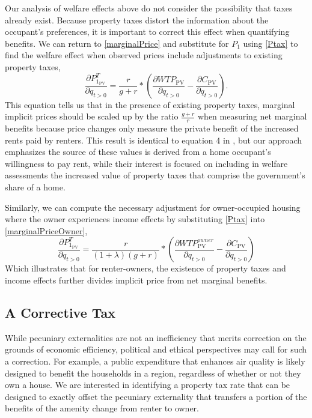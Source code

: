 \documentclass[ecta,nameyear,draft]{econsocart}
\theoremstyle{plain}
\theoremstyle{remark}
\begin{document}
Our analysis of welfare effects above do not consider the possibility that taxes already exist. Because property taxes distort the information about the occupant's preferences, it is important to correct this effect when quantifying benefits. We can return to \ref{marginalPrice} and substitute for $P_1$ using \ref{Ptax} to find the welfare effect when observed prices include adjustments to existing property taxes,
\begin{equation}
\frac{\partial P^T_{1_{\mathrm{PV}}}} {\partial q_{t>0}}=\frac{r}{g+r}*\left(\frac{\partial \mathit{WTP}_{\mathrm{PV}}}{\partial q_{t>0}}-\frac{\partial C_{\mathrm{PV}}}{\partial q_{t>0}}\right). \label{marginalPriceT}
\end{equation}
This equation tells us that in the presence of existing property taxes, marginal implicit prices should be scaled up by the ratio $\frac{g+r}{r}$ when measuring net marginal benefits because price changes only measure the private benefit of the increased rents paid by renters. This result is identical to equation 4 in \cite{niskanen77}, but our approach emphasizes the source of these values is derived from a home occupant's willingness to pay rent, while their interest is focused on including in welfare assessments the increased value of property taxes that comprise the government's share of a home.

Similarly, we can compute the necessary adjustment for owner-occupied housing where the owner experiences income effects by substituting \ref{Ptax} into \ref{marginalPriceOwner},
\begin{equation}
\frac{\partial P^T_{1_{\mathrm{PV}}}} {\partial q_{t>0}}=\frac{r}{(1+\lambda)(g+r)}*\left(
\frac{\partial \mathit{WTP}^{\mathit{owner}}_{\mathrm{PV}}}{\partial q_{t>0}}-\frac{\partial C_{\mathrm{PV}}}{\partial q_{t>0}}\right) \label{marginalPriceOwnerT}
\end{equation}
Which illustrates that for renter-owners, the existence of property taxes and income effects further divides implicit price from net marginal benefits.

\subsection{A Corrective Tax}
While pecuniary externalities are not an inefficiency that merits correction on the grounds of economic efficiency, political and ethical perspectives may call for such a correction. For example, a public expenditure that enhances air quality is likely designed to benefit the households in a region, regardless of whether or not they own a house. We are interested in identifying a property tax rate that can be designed to exactly offset the pecuniary externality that transfers a portion of the benefits of the amenity change from renter to owner.
\end{document}
